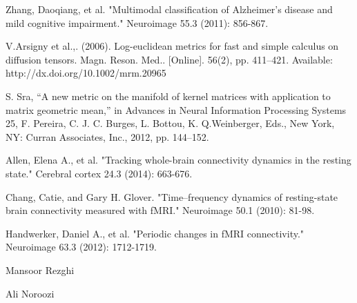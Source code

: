\documentclass[journal]{IEEEtran}
\begin{document}
\begin{thebibliography}{1}
		Zhang, Daoqiang, et al. "Multimodal classification of Alzheimer's disease and mild cognitive impairment." Neuroimage 55.3 (2011): 856-867.
		
		V.Arsigny et al.,. (2006). Log-euclidean metrics for fast and simple calculus
		on diffusion tensors. Magn. Reson. Med.. [Online]. 56(2), pp. 411–421.
		Available: http://dx.doi.org/10.1002/mrm.20965
		
		S. Sra, “A new metric on the manifold of kernel matrices with application
		to matrix geometric mean,” in Advances in Neural Information Processing
		Systems 25, F. Pereira, C. J. C. Burges, L. Bottou, K. Q.Weinberger, Eds.,
		New York, NY: Curran Associates, Inc., 2012, pp. 144–152.
		
		Allen, Elena A., et al. "Tracking whole-brain connectivity dynamics in the resting state." Cerebral cortex 24.3 (2014): 663-676.
		
		Chang, Catie, and Gary H. Glover. "Time–frequency dynamics of resting-state brain connectivity measured with fMRI." Neuroimage 50.1 (2010): 81-98.
		
		Handwerker, Daniel A., et al. "Periodic changes in fMRI connectivity." Neuroimage 63.3 (2012): 1712-1719.
		
		
	\end{thebibliography}
	
	
	\begin{IEEEbiography}{Mansoor Rezghi}
		
	\end{IEEEbiography}
	
	\begin{IEEEbiography}{Ali Noroozi}
		
	\end{IEEEbiography}
	
	
\end{document}
